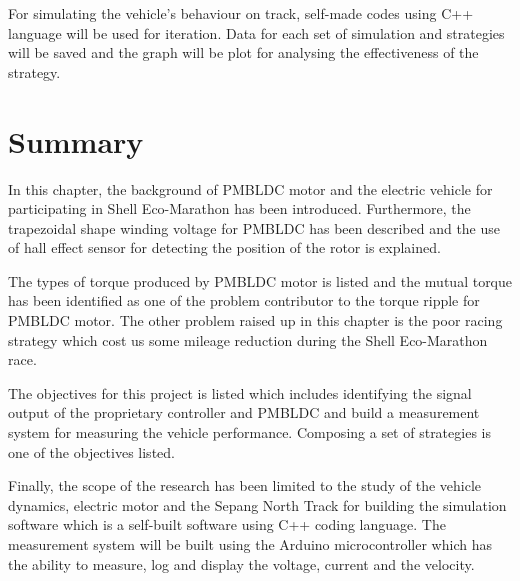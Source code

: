 For simulating the vehicle's behaviour on track, self-made codes using C++ language will be used for iteration. Data for each set of simulation and strategies will be saved and the graph will be plot for analysing the effectiveness of the strategy.

\section{Summary}
In this chapter, the background of PMBLDC motor and the electric vehicle for participating in Shell Eco-Marathon has been introduced. Furthermore, the trapezoidal shape winding voltage for PMBLDC has been described and the use of hall effect sensor for detecting the position of the rotor is explained. 

The types of torque produced by PMBLDC motor is listed and the mutual torque has been identified as one of the problem contributor to the torque ripple for PMBLDC motor. The other problem raised up in this chapter is the poor racing strategy which cost us some mileage reduction during the Shell Eco-Marathon race.

The objectives for this project is listed which includes identifying the signal output of the proprietary controller and PMBLDC and build a measurement system for measuring the vehicle performance. Composing a set of strategies is one of the objectives listed.

Finally, the scope of the research has been limited to the study of the vehicle dynamics, electric motor and the Sepang North Track for building the simulation software which is a self-built software using C++ coding language. The measurement system will be built using the Arduino microcontroller which has the ability to measure, log and display the voltage, current and the velocity. 
